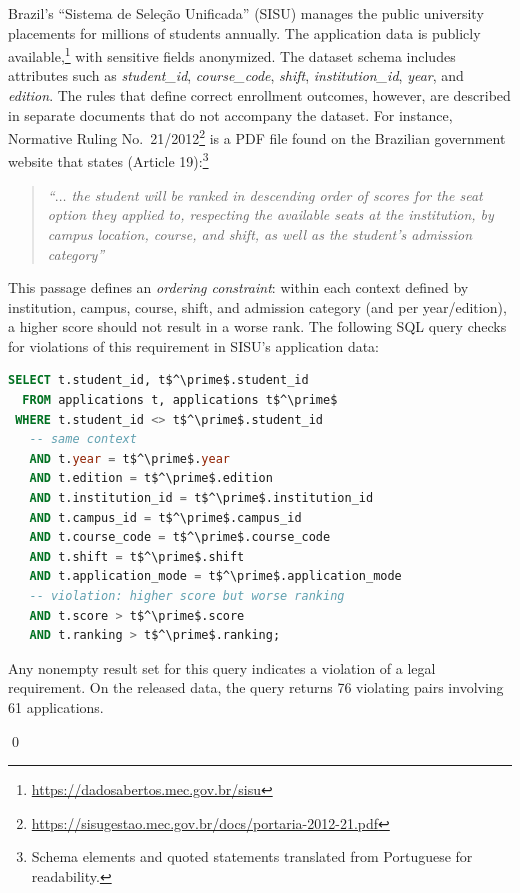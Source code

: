 

\begin{example}
\label{ex:intro}
Brazil's ``Sistema de Sele\c{c}\~{a}o Unificada'' (SISU) manages the public university placements for millions of students annually. The application data is publicly available,\footnote{\url{https://dadosabertos.mec.gov.br/sisu}} with sensitive fields anonymized. The dataset schema includes attributes such as \emph{student\_id}, \emph{course\_code}, \emph{shift}, \emph{institution\_id}, \emph{year}, and \emph{edition}. The rules that define correct enrollment outcomes, however, are described in separate documents that do not accompany the dataset. For instance, Normative Ruling No.\ 21/2012\footnote{\url{https://sisugestao.mec.gov.br/docs/portaria-2012-21.pdf}} is a PDF file found on the Brazilian government website that states (Article 19):\footnote{Schema elements and quoted statements translated from Portuguese for readability.}

\begin{quote}
\textit{``$\ldots$ the student will be ranked in descending order of scores for the seat option they applied to, respecting the available seats at the institution, by campus location, course, and shift, as well as the student's admission category''}
\end{quote}

This passage defines an \emph{ordering constraint}: within each context defined by institution, campus, course, shift, and admission category (and per year/edition), a higher score should not result in a worse rank. The following SQL query checks for violations of this requirement in SISU's application data:

\begin{lstlisting}[language=SQL, frame=none, basicstyle=\footnotesize\ttfamily, mathescape]
SELECT t.student_id, t$^\prime$.student_id
  FROM applications t, applications t$^\prime$
 WHERE t.student_id <> t$^\prime$.student_id
   -- same context
   AND t.year = t$^\prime$.year
   AND t.edition = t$^\prime$.edition
   AND t.institution_id = t$^\prime$.institution_id
   AND t.campus_id = t$^\prime$.campus_id
   AND t.course_code = t$^\prime$.course_code
   AND t.shift = t$^\prime$.shift
   AND t.application_mode = t$^\prime$.application_mode
   -- violation: higher score but worse ranking
   AND t.score > t$^\prime$.score
   AND t.ranking > t$^\prime$.ranking;
\end{lstlisting}

Any nonempty result set for this query indicates a violation of a legal requirement. On the released data, the query returns 76 violating pairs involving 61 applications.


\qed
\end{example}




